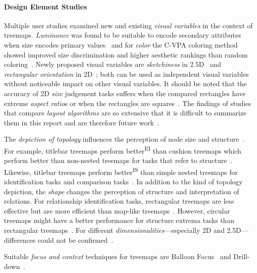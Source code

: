 \documentclass[sigconf,
natbib=true]{acmart}
\begin{document}
\paragraph{\textbf{Design Element Studies}}
Multiple user studies examined new and existing \emph{visual variables} in the context of treemaps.
\emph{Luminance} was found to be suitable to encode secondary attributes when size encodes primary values~\cite{kong2010-guidelines} and for \emph{color} the C-VPA coloring method showed improved size discrimination and higher aesthetic rankings than random coloring~\cite{xie2017-coloraesthetics}.
Newly proposed visual variables are \emph{sketchiness} in 2.5D~\cite{limberger2016-sketchy} and \emph{rectangular orientation} in 2D~\cite{liang2012-orientation}; both can be used as independent visual variables without noticeable impact on other visual variables.
It should be noted that the accuracy of 2D \emph{size} judgement tasks suffers when the compared rectangles have extreme \emph{aspect ratio}s or when the rectangles are squares~\cite{kong2010-guidelines}.
The findings of studies that compare \emph{layout algorithms} are so extensive that it is difficult to summarize them in this report and are therefore future work~\cite{bederson2002-quantum,hahn2017-directionchange,zhou2017-cartography}.
\par
The \emph{depiction of topology} influences the perception of node size and structure~\cite{johnson1993-categorical}.
For example, titlebar treemaps perform better\textsuperscript{EI} than cushion treemaps which perform better than non-nested treemaps for tasks that refer to structure~\cite{kobsa2004-systems,irani2006-perception,biuk-aghai2017-maplike}.
Likewise, titlebar treemaps perform better\textsuperscript{IS} than simple nested treemaps for identification tasks and comparison tasks~\cite{goldberg2005-monitoring}.
In addition to the kind of topology depiction, the \emph{shape} changes the perception of structure and interpretation of relations.
For relationship identification tasks, rectangular treemaps are less effective but are more efficient than map-like treemaps~\cite{biuk-aghai2017-maplike}.
However, circular treemaps might have a better performance for structure extrema tasks than rectangular treemaps~\cite{wang2006-cropcircles}.
For different \emph{dimensionalities}---especially 2D and 2.5D---differences could not be confirmed~\cite{bladh2004-threedimensions}.
\par
Suitable \emph{focus and context} techniques for treemaps are Balloon Focus~\cite{tu2008-multifocus} and Drill-down~\cite{shi2005-contentbrowsing}.
\end{document}
